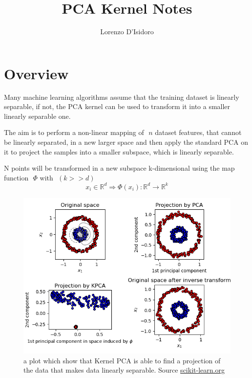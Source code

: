 \documentclass[11pt]{article}
\title{\textbf{PCA Kernel Notes}}
\author{Lorenzo D'Isidoro}
\date{}
\newcommand{\R}{\mathbb{R}}
\begin{document}
\maketitle

\section{Overview}
Many machine learning algorithms assume that the training dataset is linearly separable, if not, the PCA kernel can be used to transform it into a smaller linearly separable one.

The aim is to perform a non-linear mapping of \( \) $ n $ dataset features, that cannot be linearly separated, in a new larger space and then apply the standard PCA on it to project the samples into a smaller subspace, which is linearly separable.

N points will be transformed in a new subspace k-dimensional using the map function \( \) $ \Phi $ with \( \) $ (k>>d) $
\begin{equation*}
x_{i} 	\in 	\R^{d} \Rightarrow \Phi(x_{i}):\R^{d} \rightarrow \R^{k} 
\end{equation*} 

\begin{figure}[h]
    \centering
    \includegraphics[scale=0.5]{sphx_glr_plot_kernel_pca_001}
    \caption{a plot which show that Kernel PCA is able to find a projection of the data that makes data linearly separable. Source \href{https://scikit-learn.org/stable/auto_examples/decomposition/plot_kernel_pca.html}{scikit-learn.org}}
    \label{fig:mesh1}
\end{figure}
\end{document}
